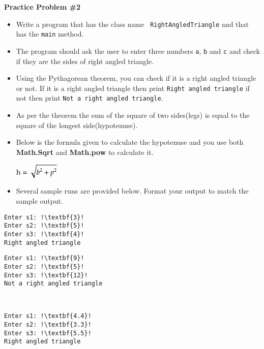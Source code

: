 \documentclass[12pt]{article}
\begin{document}
\vspace*{0.5cm}
\noindent\textbf{Practice Problem \#2}
\begin{itemize}
	\item Write a program that has the class name \texttt{ RightAngledTriangle} and that has the \texttt{main} method.
	\item The program should ask the user to enter three numbers \texttt{a}, \texttt{b} and \texttt{c} and check if they are the sides of right angled triangle.
	\item Using the Pythagorean theorem, you can check if it is a right angled triangle or not. If it is a right angled triangle then print \texttt{Right angled triangle} if not then print \texttt{Not a right angled triangle}. 
	\item As per the theorem the sum of the square of two sides(legs) is equal to the square of the longest side(hypotenuse). 
	\item Below is the formula given to calculate the hypotenuse and you  use both \textbf{Math.Sqrt} and \textbf{Math.pow} to calculate it.
\begin{center}
	\textbf{$\rm{\mathtt{\displaystyle}\displaystyle h =  \sqrt{{\displaystyle}\displaystyle b^2 + \displaystyle p^2}}$}
\end{center}
	\item Several sample runs are provided below. Format your output to match the sample output.
\end{itemize}
\begin{center}
\begin{minipage}{4cm}
\begin{lstlisting}[escapechar=!]
Enter s1: !\textbf{3}!
Enter s2: !\textbf{5}!
Enter s3: !\textbf{4}!
Right angled triangle
\end{lstlisting}
\end{minipage}
\hspace*{0.5cm}
\begin{minipage}{4.5cm}
\begin{lstlisting}[escapechar=!]
Enter s1: !\textbf{9}!
Enter s2: !\textbf{5}!
Enter s3: !\textbf{12}!
Not a right angled triangle
\end{lstlisting}
\end{minipage} \\
\vspace*{0.1cm}
\begin{minipage}{4cm}
\begin{lstlisting}[escapechar=!]
Enter s1: !\textbf{4.4}!
Enter s2: !\textbf{3.3}!
Enter s3: !\textbf{5.5}!
Right angled triangle
\end{lstlisting}
\end{minipage} 
\end{center}	
\end{document}

